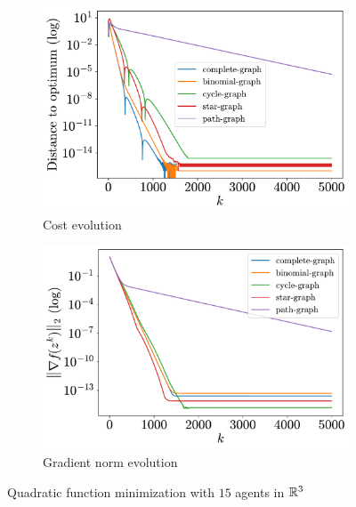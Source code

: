 \documentclass[a4paper,11pt,oneside]{book}
\begin{document}
\begin{figure}[H]
      \centering
      \begin{subfigure}[t]{0.46\linewidth}
            \centering
            \includegraphics[width=\linewidth]{./figs/quadratic/15_3/distance.pdf} 
            \caption{Cost evolution}
      \end{subfigure}
      \hfill
      \begin{subfigure}[t]{0.46\linewidth}
            \centering
            \includegraphics[width=\linewidth]{./figs/quadratic/15_3/gradient.pdf} 
            \caption{Gradient norm evolution}
      \end{subfigure}
      \caption{Quadratic function minimization with $15$ agents in ${\mathbb{R}}^{3}$}
      \label{fig:quadratic_15_3}
\end{figure}
\end{document}
